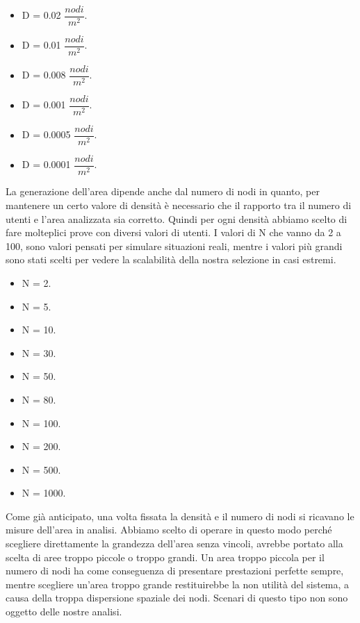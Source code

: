 \bigskip

\begin{itemize}
	\item D = 0.02 $ \dfrac{nodi}{m^{2}} $.
	\item D = 0.01 $ \dfrac{nodi}{m^{2}} $.
	\item D = 0.008 $ \dfrac{nodi}{m^{2}} $.
	\item D = 0.001 $ \dfrac{nodi}{m^{2}} $.
	\item D = 0.0005 $ \dfrac{nodi}{m^{2}} $.
	\item D = 0.0001 $ \dfrac{nodi}{m^{2}} $.
\end{itemize}
La generazione dell'area dipende anche dal numero di nodi in quanto, per mantenere un certo valore di densità è necessario che il rapporto tra il numero di utenti e l'area analizzata sia corretto. Quindi per ogni densità abbiamo scelto di fare molteplici prove con diversi valori di utenti. I valori di N che vanno da 2 a 100, sono valori pensati per simulare situazioni reali, mentre i valori più grandi sono stati scelti per vedere la scalabilità della nostra selezione in casi estremi.
\medskip

\begin{itemize}
	\item N = 2.
	\item N = 5.
	\item N = 10.
	\item N = 30.
	\item N = 50.
	\item N = 80.
	\item N = 100.
	\item N = 200.
	\item N = 500.
	\item N = 1000.
\end{itemize}
Come già anticipato, una volta fissata la densità e il numero di nodi si ricavano le misure dell'area in analisi. Abbiamo scelto di operare in questo modo perché scegliere direttamente la grandezza dell'area senza vincoli, avrebbe portato alla scelta di aree troppo piccole o troppo grandi. Un area troppo piccola per il numero di nodi ha come conseguenza di presentare prestazioni perfette sempre, mentre scegliere un'area troppo grande restituirebbe la non utilità del sistema, a causa della troppa dispersione spaziale dei nodi. Scenari di questo tipo non sono oggetto delle nostre analisi.

